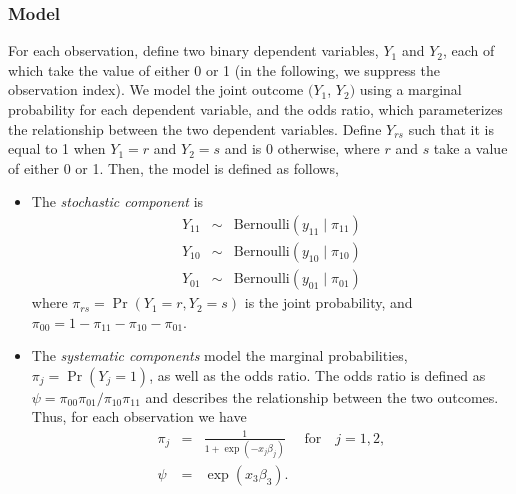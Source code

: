 \documentclass{article}
\begin{document}
\subsubsection{Model}

For each observation, define two binary dependent variables, $Y_1$ and
$Y_2$, each of which take the value of either 0 or 1 (in the
following, we suppress the observation index).  We model the joint
outcome $(Y_1$, $Y_2)$ using a marginal probability for each dependent
variable, and the odds ratio, which parameterizes the relationship
between the two dependent variables. Define $Y_{rs}$ such that it is
equal to 1 when $Y_1=r$ and $Y_2=s$ and is 0 otherwise, where $r$ and
$s$ take a value of either 0 or 1. Then, the model is defined as follows,

\begin{itemize}
 
\item The \emph{stochastic component} is
\begin{eqnarray*}
  Y_{11} &\sim& \textrm{Bernoulli}(y_{11} \mid \pi_{11}) \\
  Y_{10} &\sim& \textrm{Bernoulli}(y_{10} \mid \pi_{10}) \\
  Y_{01} &\sim& \textrm{Bernoulli}(y_{01} \mid \pi_{01})
\end{eqnarray*}
where $\pi_{rs}=\Pr(Y_1=r, Y_2=s)$ is the joint probability, and
$\pi_{00}=1-\pi_{11}-\pi_{10}-\pi_{01}$.


\item The \emph{systematic components} model the marginal probabilities,
  $\pi_j=\Pr(Y_j=1)$, as well as the odds ratio.  The odds ratio
  is defined as $\psi = \pi_{00} \pi_{01}/\pi_{10}\pi_{11}$ and
  describes the relationship between the two outcomes.  Thus, for each
  observation we have
\begin{eqnarray*}
\pi_j & = & \frac{1}{1 + \exp(-x_j \beta_j)} \quad \textrm{ for} \quad
j=1,2, \\
\psi &= & \exp(x_3 \beta_3).
\end{eqnarray*}

\end{itemize}
\end{document}
